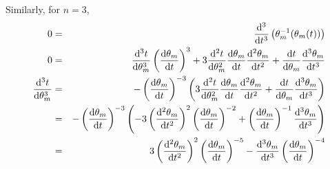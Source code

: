 \documentclass[11pt]{article} %
\begin{document}
Similarly, for $ n = 3 $,
\begin{eqnarray}
	0 & = & \dv[3]{}{t} \left( \theta_m^{-1}(\theta_m(t)) \right) \\
	0 & = & \dv[3]{t}{\theta_m} \left( \dv{\theta_m}{t} \right)^3 + 3 \dv[2]{t}{\theta_m} \dv{\theta_m}{t} \dv[2]{\theta_m}{t} + \dv{t}{\theta_m} \dv[3]{\theta_m}{t}  \\
	\dv[3]{t}{\theta_m} & = & -\left( \dv{\theta_m}{t} \right)^{-3} \left( 3 \dv[2]{t}{\theta_m} \dv{\theta_m}{t} \dv[2]{\theta_m}{t} + \dv{t}{\theta_m} \dv[3]{\theta_m}{t} \right) \\
	& = & -\left( \dv{\theta_m}{t} \right)^{-3} \left( -3 \left( \dv[2]{\theta_m}{t} \right)^2 \left( \dv{\theta_m}{t} \right)^{-2}  + \left( \dv{\theta_m}{t} \right)^{-1} \dv[3]{\theta_m}{t} \right) \\
	& = & 3 \left( \dv[2]{\theta_m}{t} \right)^2 \left( \dv{\theta_m}{t} \right)^{-5}  - \dv[3]{\theta_m}{t} \left( \dv{\theta_m}{t} \right)^{-4} 
\end{eqnarray}
\end{document}
